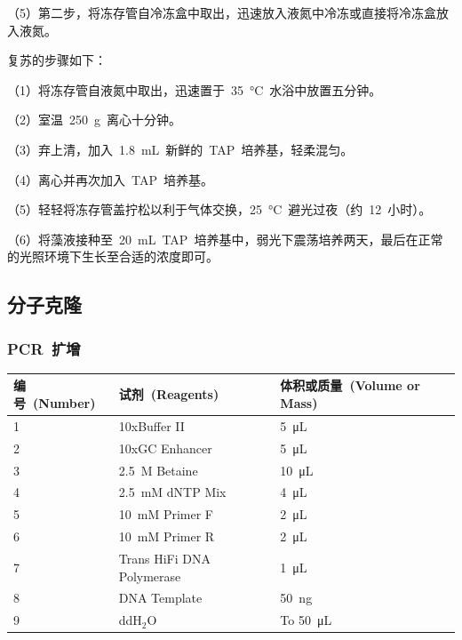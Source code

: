 （5）第二步，将冻存管自冷冻盒中取出，迅速放入液氮中冷冻或直接将冷冻盒放入液氮。

复苏的步骤如下：

（1）将冻存管自液氮中取出，迅速置于\ \SI{35}{\degreeCelsius}\ 水浴中放置五分钟。

（2）室温\ \SI{250}{\g}\ 离心十分钟。

（3）弃上清，加入\ \SI{1.8}{\mL}\ 新鲜的\ TAP\ 培养基，轻柔混匀。

（4）离心并再次加入\ TAP\ 培养基。

（5）轻轻将冻存管盖拧松以利于气体交换，\SI{25}{\degreeCelsius}\ 避光过夜（约\ 12\ 小时）。

（6）将藻液接种至\ \SI{20}{\mL}\ TAP\ 培养基中，弱光下震荡培养两天，最后在正常的光照环境下生长至合适的浓度即可。

\subsection{分子克隆}\label{subsec:melcular cloning}
\subsubsection{PCR\ 扩增}
\renewcommand{\tablename}{表}
\begin{table}[!ht]
\centering
{
\par}
\small
\begin{tabular*}{\textwidth}[c]{@{\extracolsep{\fill}}lll}
\toprule
编号\ (Number) & 试剂\ (Reagents) & 体积或质量\ (Volume or Mass)\\
\midrule
1 & 10xBuffer II & \SI{5}{\micro\liter}\\
2 & 10xGC Enhancer & \SI{5}{\micro\liter}\\
3 & \SI{2.5}{\nauticalmile} Betaine & \SI{10}{\micro\liter}\\
4 & \SI{2.5}{\milli\nauticalmile} dNTP Mix & \SI{4}{\micro\liter}\\
5 & \SI{10}{\milli\nauticalmile} Primer F & \SI{2}{\micro\liter}\\
6 & \SI{10}{\milli\nauticalmile} Primer R & \SI{2}{\micro\liter}\\
7 & Trans HiFi DNA Polymerase & \SI{1}{\micro\liter}\\
8 & DNA Template & \SI{50}{\nano\gram}\\
9 & ddH$_2$O & To \SI{50}{\micro\liter}\\
\bottomrule
\end{tabular*}
\end{table}

